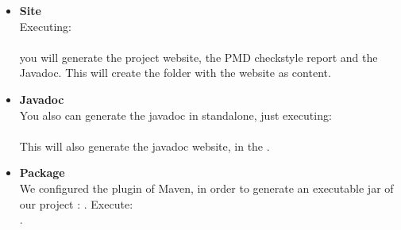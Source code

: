\documentclass[a4paper,10pt]{report}
\newcommand{\empha}[1]{\textbf{\color{blue}{#1}}}
\begin{document}
					\begin{itemize}
						\item \textbf{Site}\\
							Executing: \\ \empha{mvn site}\\ you will generate the project website, the PMD checkstyle report and the Javadoc. This will create the \empha{target} folder with the website as content.
						\item \textbf{Javadoc}\\
							You also can generate the javadoc in standalone, just executing:\\ \empha{mvn javadoc:javadoc}\\ This will also generate the javadoc website, in the  \empha{target folder}.

						\item \textbf{Package}\\
							We configured the \empha{package} plugin of Maven, in order to generate an executable jar of our project :  \empha{almago-1.0-SNAPSHOT.jar} . Execute:\\ \empha{mvn package}.

					\end{itemize}
\end{document}
